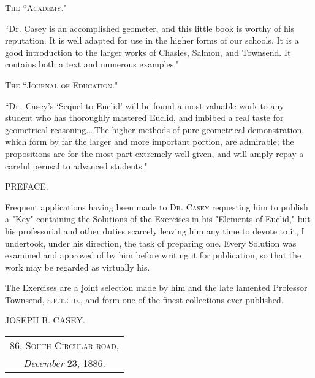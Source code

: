 \documentclass[oneside]{book}
\begin{document}
\bigskip
\begin{center}
\textsc{The ``Academy."}
\end{center}
\nopagebreak

\begin{footnotesize}
``Dr. Casey is an accomplished geometer, and this little book
is worthy of his reputation. It is well adapted for use in the
higher forms of our schools. It is a good introduction to the
larger works of Chasles, Salmon, and Townsend. It contains
both a text and numerous examples."
\end{footnotesize}

\bigskip
\begin{center}
\textsc{The ``Journal of Education."}
\end{center}
\nopagebreak

\begin{footnotesize}
``Dr.~Casey's `Sequel to Euclid' will be found a most valuable
work to any student who has thoroughly mastered Euclid, and
imbibed a real taste for geometrical reasoning.\ldots The
higher methods of pure geometrical demonstration, which form
by far the larger and more important portion, are admirable; the
propositions are for the most part extremely well given, and will
amply repay a careful perusal to advanced students."
\end{footnotesize}

\newpage
\begin{center}
{\LARGE PREFACE.}
\end{center}


Frequent applications having been made to \textsc{Dr. Casey}
requesting him to publish a "Key" containing the
Solutions of the Exercises in his "Elements of Euclid,"
but his professorial and other duties scarcely leaving
him any time to devote to it, I undertook, under his
direction, the task of preparing one. Every Solution
was examined and approved of by him before writing
it for publication, so that the work may be regarded
as virtually his.

The Exercises are a joint selection made by him and
the late lamented Professor Townsend, \textsc{s.f.t.c.d.}, and
form one of the finest collections ever published.

\bigskip

\begin{flushright}
JOSEPH B. CASEY. \mbox\quad
\end{flushright}
\bigskip

\noindent
\begin{tabular}{@{}c@{}}
\textsc{86, South Circular-road,}\\
\textit{December} 23, 1886.
\end{tabular}
\end{document}
